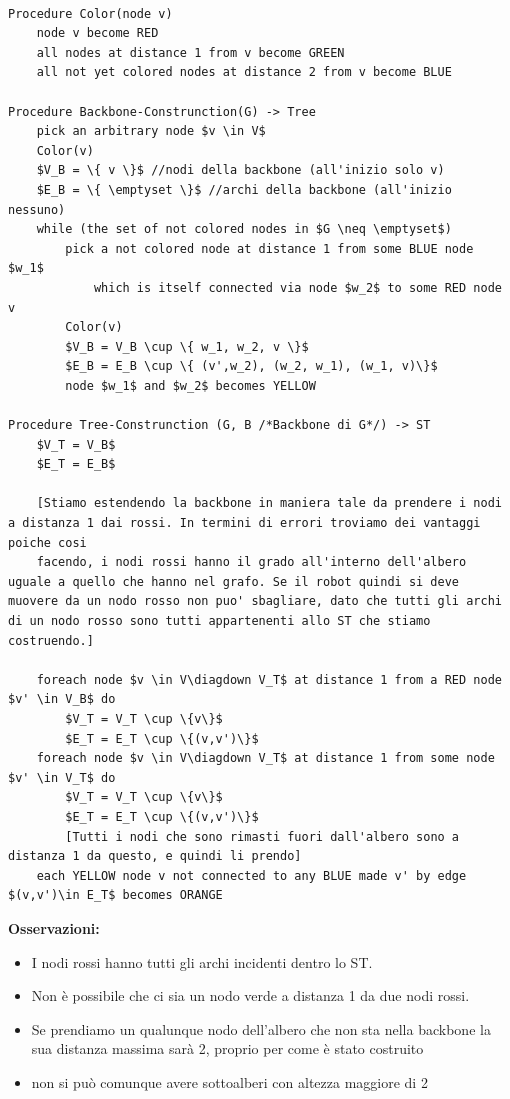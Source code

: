 \begin{lstlisting}

Procedure Color(node v)
	node v become RED
	all nodes at distance 1 from v become GREEN
	all not yet colored nodes at distance 2 from v become BLUE
	
Procedure Backbone-Construnction(G) -> Tree
	pick an arbitrary node $v \in V$
	Color(v)
	$V_B = \{ v \}$ //nodi della backbone (all'inizio solo v)
	$E_B = \{ \emptyset \}$ //archi della backbone (all'inizio nessuno)
	while (the set of not colored nodes in $G \neq \emptyset$)
		pick a not colored node at distance 1 from some BLUE node $w_1$ 
			which is itself connected via node $w_2$ to some RED node v
		Color(v)
		$V_B = V_B \cup \{ w_1, w_2, v \}$
		$E_B = E_B \cup \{ (v',w_2), (w_2, w_1), (w_1, v)\}$
		node $w_1$ and $w_2$ becomes YELLOW
		
Procedure Tree-Construnction (G, B /*Backbone di G*/) -> ST
	$V_T = V_B$
	$E_T = E_B$
	
	[Stiamo estendendo la backbone in maniera tale da prendere i nodi a distanza 1 dai rossi. In termini di errori troviamo dei vantaggi poiche cosi
	facendo, i nodi rossi hanno il grado all'interno dell'albero uguale a quello che hanno nel grafo. Se il robot quindi si deve muovere da un nodo rosso non puo' sbagliare, dato che tutti gli archi di un nodo rosso sono tutti appartenenti allo ST che stiamo costruendo.]
	
	foreach node $v \in V\diagdown V_T$ at distance 1 from a RED node $v' \in V_B$ do
		$V_T = V_T \cup \{v\}$
		$E_T = E_T \cup \{(v,v')\}$
	foreach node $v \in V\diagdown V_T$ at distance 1 from some node $v' \in V_T$ do
		$V_T = V_T \cup \{v\}$
		$E_T = E_T \cup \{(v,v')\}$ 
		[Tutti i nodi che sono rimasti fuori dall'albero sono a distanza 1 da questo, e quindi li prendo]
    each YELLOW node v not connected to any BLUE made v' by edge $(v,v')\in E_T$ becomes ORANGE
\end{lstlisting}

\textbf{Osservazioni: }\\
\vspace{-10mm}
\begin{itemize}
\item I nodi rossi hanno tutti gli archi incidenti dentro lo ST.
\item Non è possibile che ci sia un nodo verde a distanza 1 da due nodi rossi.
\item Se prendiamo un qualunque nodo dell'albero che non sta nella backbone la sua distanza massima sarà 2, proprio per come è stato costruito
\item non si può comunque avere sottoalberi con altezza maggiore di 2
\end{itemize}

